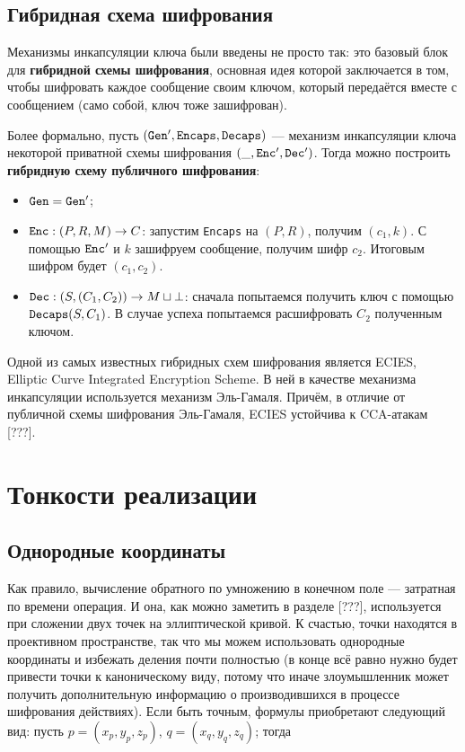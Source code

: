 \documentclass[a4paper,14pt]{extarticle}
\begin{document}
\subsection{Гибридная схема шифрования}

Механизмы инкапсуляции ключа были введены не просто так: это базовый блок для
\textbf{гибридной схемы шифрования}, основная идея которой заключается в том,
чтобы шифровать каждое сообщение своим ключом, который передаётся вместе с
сообщением (само собой, ключ тоже зашифрован).

Более формально, пусть $(\verb|Gen|', \verb|Encaps|, \verb|Decaps|)$ ---
механизм инкапсуляции ключа некоторой приватной схемы шифрования
$(\_, \verb|Enc|', \verb|Dec|')$. Тогда можно построить
\textbf{гибридную схему публичного шифрования}:

\begin{itemize}
    \item $\verb|Gen| = \verb|Gen|'$;
    \item $\verb|Enc|: (P, R, M) \to C$: запустим \verb|Encaps| на $(P, R)$,
        получим $(c_1, k)$. С помощью $\verb|Enc|'$ и $k$ зашифруем сообщение,
        получим шифр $c_2$. Итоговым шифром будет $(c_1, c_2)$.
    \item $\verb|Dec|: (S, (C_1, C_2)) \to M \sqcup \bot$: сначала попытаемся
        получить ключ с помощью $\verb|Decaps|(S, C_1)$. В случае успеха
        попытаемся расшифровать $C_2$ полученным ключом.
\end{itemize}

Одной из самых известных гибридных схем шифрования является ECIES, Elliptic
Curve Integrated Encryption Scheme. В ней в качестве механизма инкапсуляции
используется механизм Эль-Гамаля. Причём, в отличие от публичной схемы
шифрования Эль-Гамаля, ECIES устойчива к CCA-атакам [???].

\newpage

\section{Тонкости реализации}

\subsection{Однородные координаты}

Как правило, вычисление обратного по умножению в конечном поле --- затратная по
времени операция. И она, как можно заметить в разделе [???], используется при
сложении двух точек на эллиптической кривой. К счастью, точки находятся в
проективном пространстве, так что мы можем использовать однородные координаты и
избежать деления почти полностью (в конце всё равно нужно будет привести точки к
каноническому виду, потому что иначе злоумышленник может получить дополнительную
информацию о производившихся в процессе шифрования действиях). Если быть точным,
формулы приобретают следующий вид: пусть $p = (x_p, y_p, z_p)$,
$q = (x_q, y_q, z_q)$; тогда
\end{document}
